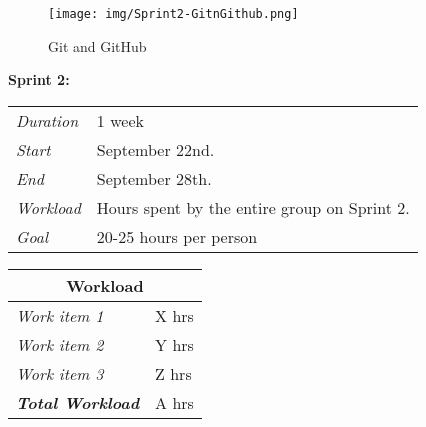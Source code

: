 \documentclass[11pt]{report}
\begin{document}

\begin{figure}[ht!]
\centering
\texttt{[image: img/Sprint2-GitnGithub.png]}
\caption{Git and GitHub \label{overflow}}
\end{figure}




\begin{minipage}{\linewidth}
\centering
\setlength{\tabcolsep}{22pt}
\textbf{Sprint 2:} 
\smallskip
{}
\begin{tabular}{ |l l| }
	\hline
	\it{Duration} & 1 week \\
	\it{Start} & September 22nd. \\
	\it{End} & September 28th. \\
	\it{Workload} & Hours spent by the entire group on Sprint 2. \\
	\it{Goal} & 20-25 hours per person \\
	\hline
\end{tabular}
\end{minipage}




\begin{minipage}{\linewidth}
\setlength{\tabcolsep}{15pt}
\centering
{}
\begin{tabular}{ |l|l| }
	\hline
	\multicolumn{2}{|c|}{\cellcolor{gray!25} Workload} \\
	\hline
	\it{Work item 1} & X hrs\\
	\it{Work item 2} & Y hrs\\
	\it{Work item 3} & Z hrs\\
	\hline
	\textbf{\textit{Total Workload}} & A hrs\\
	\hline
\end{tabular}
\end{minipage}
\end{document}
